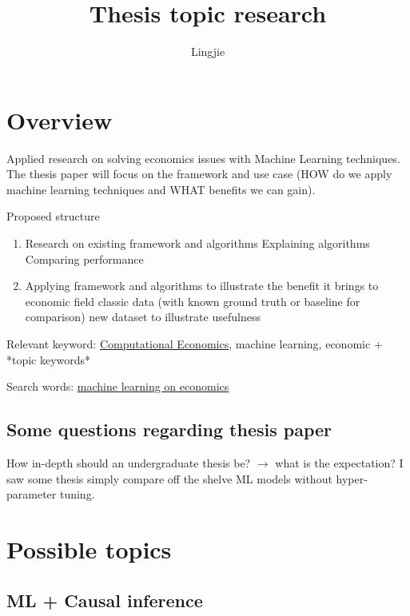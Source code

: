 \documentclass[11pt, oneside]{article}   	%
\title{Thesis topic research}
\author{Lingjie}
\begin{document}
\maketitle

\tableofcontents

\section{Overview}
    Applied research on solving economics issues with Machine Learning techniques.
    The thesis paper will focus on the framework and use case
    (HOW do we apply machine learning techniques and WHAT benefits we can gain).

    Proposed structure
    \begin{enumerate}
        \item Research on existing framework and algorithms
            \subitem[1.1] Explaining algorithms
            \subitem[1.2] Comparing performance
        \item Applying framework and algorithms to illustrate the benefit it brings to economic field
            \subitem[2.1] classic data (with known ground truth or baseline for comparison)
            \subitem[2.2] new dataset to illustrate usefulness
    \end{enumerate}

    Relevant keyword: \href{https://www.springer.com/journal/10614}{Computational Economics}, 
    machine learning, economic + *topic keywords*

    Search words:
    \href{https://scholar.google.com.sg/scholar?q=
    machine+learning+on+economics&hl=en&as_sdt=0&as_vis=1&oi=scholart}{machine learning on economics}

    \subsection{Some questions regarding thesis paper}

    How in-depth should an undergraduate thesis be? $\rightarrow$ what is the expectation?
    I saw some thesis simply compare off the shelve ML models without hyper-parameter tuning.

\section{Possible topics}

    \subsection{ML + Causal inference}
\end{document}
